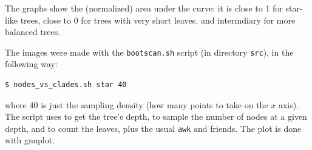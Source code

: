 The graphs show the (normalized) area under the curve: it is close to 1 for star-like trees, close to 0 for trees with very short leaves, and intermdiary for more balanced trees.

The images were made with the \texttt{bootscan.sh} script (in directory \texttt{src}), in the following way:
\begin{verbatim}
$ nodes_vs_clades.sh star 40
\end{verbatim}
where 40 is just the sampling density (how many points to take on the $x$
axis). The script uses \distance{} to get the tree's depth, \ed{} to sample the number of nodes at a given depth, and \nwindent{} to count the leaves, plus the usual \texttt{awk} and friends. The plot is done with gnuplot.
